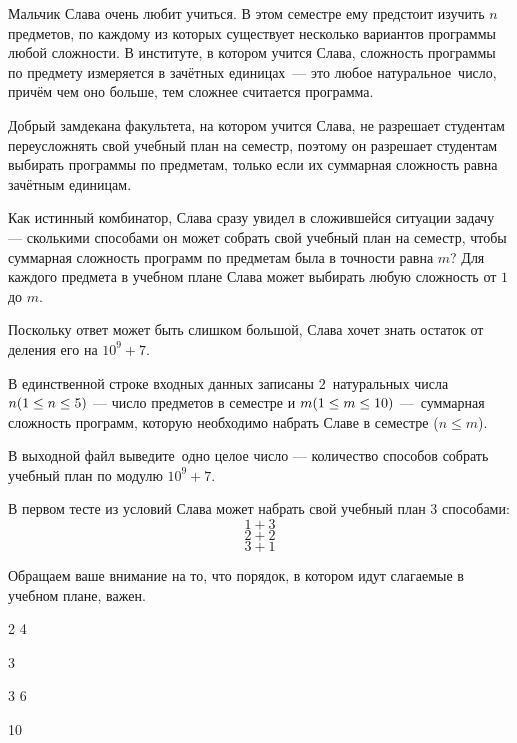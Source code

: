 
Мальчик Слава очень любит учиться. В этом семестре ему предстоит изучить $n$ предметов, по каждому из которых существует несколько вариантов программы любой сложности. В институте, в котором учится Слава, сложность программы по предмету измеряется в зачётных единицах — это любое натуральное число, причём чем оно больше, тем сложнее считается программа.

Добрый замдекана факультета, на котором учится Слава, не разрешает студентам переусложнять свой учебный план на семестр, поэтому он разрешает студентам выбирать программы по предметам, только если их суммарная сложность равна  зачётным единицам.

Как истинный комбинатор, Слава сразу увидел в сложившейся ситуации задачу — сколькими способами он может собрать свой учебный план на семестр, чтобы суммарная сложность программ по предметам была в точности равна $m$? Для каждого предмета в учебном плане Слава может выбирать любую сложность от $1$ до $m$.

Поскольку ответ может быть слишком большой, Слава хочет знать остаток от деления его на $10^9 + 7$.


В единственной строке входных данных записаны $2$ натуральных числа $n\space(1\leq n\leq 5)$ — число предметов в семестре и $m\space(1\leq m\leq 10)$ — суммарная сложность программ, которую необходимо набрать Славе в семестре ($n \leq m$).  

\outputfmtSection

В выходной файл выведите одно целое число — количество способов собрать учебный план по модулю $10^9 + 7$.

\explanationSection

В первом тесте из условий Слава может набрать свой учебный план $3$ способами:
$$1+3$$ $$2+2$$ $$3+1$$

Обращаем ваше внимание на то, что порядок, в котором идут слагаемые в учебном плане, важен.


\begin{myverbbox}[\small]{\vinput}
    2 4
\end{myverbbox}

\begin{myverbbox}[\small]{\voutput}
    3
\end{myverbbox}


\begin{myverbbox}[\small]{\vinput}
    3 6
\end{myverbbox}

\begin{myverbbox}[\small]{\voutput}
    10
\end{myverbbox}


